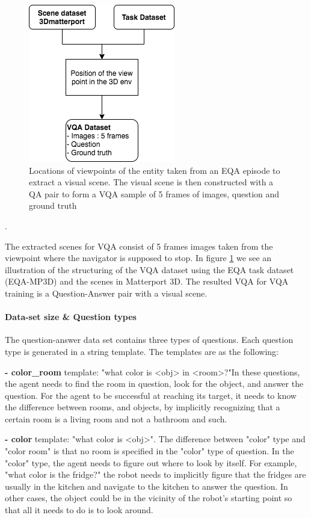 \begin{figure}[H]
\centering
\includegraphics[scale=0.5]{images/VQAConstruct.png}
\caption{Locations of viewpoints of the entity taken from an EQA episode to extract a visual scene. The visual scene is then constructed with a QA pair to form a VQA sample of 5 frames of images, question and ground truth }
\label{fig:vqaconstruct}
\end{figure}.

The extracted scenes for VQA consist of 5 frames images taken from the viewpoint where the navigator is supposed to stop. In figure \ref{fig:vqaconstruct} we see an illustration of the structuring of the VQA dataset using the EQA task dataset (EQA-MP3D) and the scenes in Matterport 3D. The resulted VQA for VQA training is a Question-Answer pair with a visual scene. 

\paragraph{Data-set size \& Question types}
The question-answer data set contains three types of questions. Each question type is generated in a string template. The templates are as the following:

\textbf{- color\_room} template: "what color is <obj> in  <room>?"In these questions, the agent needs to find the room in question, look for the object, and answer the question. For the agent to be successful at reaching its target, it needs to know the difference between rooms, and objects, by implicitly recognizing that a certain room is a living room and not a bathroom and such.  

\textbf{- color} template: "what color is <obj>". The difference between "color" type and "color room" is that no room is specified in the "color" type of question. In the "color" type, the agent needs to figure out where to look by itself. For example, "what color is the fridge?" the robot needs to implicitly figure that the fridges are usually in the kitchen and navigate to the kitchen to answer the question. In other cases, the object could be in the vicinity of the robot's starting point so that all it needs to do is to look around. 


